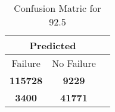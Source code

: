 \begin{table}[] 
\label{Table: Prediction Accuracy-DMD92.5OnlySunEKF-resetReflection-Reflection} 
\caption{Confusion Matric for 92.5} 
\centering 
\begin{tabular} 
 {@{}ccc@{}} 
\toprule 
\multicolumn{2}{c}{\textbf{Predicted}}
 \\ \midrule 
\multicolumn{1}{|c|}{Failure} & 
\multicolumn{1}{c|}{No Failure}
 \\ \midrule 
\multicolumn{1}{|c|}{\color{green}\textbf{115728}} & 
\multicolumn{1}{c|}{\color{red}\textbf{9229}}
 \\ \midrule 
\multicolumn{1}{|c|}{\color{red}\textbf{3400}} & 
\multicolumn{1}{c|}{\color{green}\textbf{41771}}
 \\ \bottomrule 
\end{tabular} 
\end{table} 

